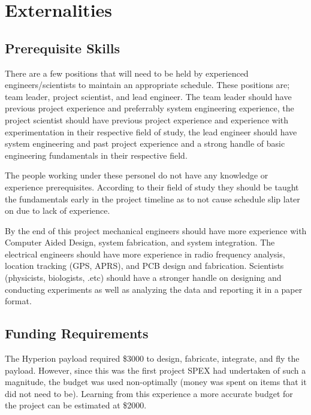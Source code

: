 \documentclass[conference]{IEEEtran} %
\begin{document}
\section{Externalities}
\subsection{Prerequisite Skills}
There are a few positions that will need to be held by experienced engineers/scientists to maintain an appropriate schedule. These positions are; team leader, project scientist, and lead 
engineer. The team leader should have previous project experience and preferrably system engineering experience, the project scientist should have previous project experience and experience with experimentation in their respective field 
of study, the lead engineer should have system engineering and past project experience and a strong handle of basic engineering fundamentals in their respective field. 

The people working under these personel do not have any knowledge or experience prerequisites. According to their field of study they should be taught the fundamentals early in the project 
timeline as to not cause schedule slip later on due to lack of experience. 

By the end of this project mechanical engineers should have more experience with Computer Aided Design, system fabrication, and system integration. The electrical engineers should have more 
experience in radio frequency analysis, location tracking (GPS, APRS), and PCB design and fabrication. Scientists (physicists, biologists, .etc) should have a stronger handle on designing and conducting 
experiments as well as analyzing the data and reporting it in a paper format. 

\subsection{Funding Requirements}
The Hyperion payload required \$3000 to design, fabricate, integrate, and fly the payload. However, since this was the first project SPEX had undertaken of such a magnitude, the budget was 
used non-optimally (money was spent on items that it did not need to be). Learning from this experience a more accurate budget for the project can be estimated at \$2000. 
\end{document}
